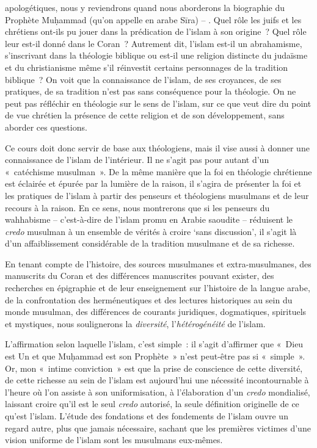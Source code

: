 apologétiques, nous y reviendrons quand nous aborderons la biographie du
Prophète Muḥammad (qu'on appelle en arabe Sīra) -- . Quel rôle les juifs
et les chrétiens ont-ils pu jouer dans la prédication de l'islam à son
origine~? Quel rôle leur est-il donné dans le Coran~? Autrement dit,
l'islam est-il un abrahamisme, s'inscrivant dans la théologie biblique
ou est-il une religion distincte du judaïsme et du christianisme même
s'il réinvestit certains personnages de la tradition biblique~? On voit
que la connaissance de l'islam, de ses croyances, de ses pratiques, de
sa tradition n'est pas sans conséquence pour la théologie. On ne peut
pas réfléchir en théologie sur le sens de l'islam, sur ce que veut dire
du point de vue chrétien la présence de cette religion et de son
développement, sans aborder ces questions.

Ce cours doit donc servir de base aux théologiens, mais il vise aussi à
donner une connaissance de l'islam de l'intérieur. Il ne s'agit pas pour
autant d'un «~catéchisme musulman~». De la même manière que la foi en
théologie chrétienne est éclairée et épurée par la lumière de la raison,
il s'agira de présenter la foi et les pratiques de l'islam à partir des
penseurs et théologiens musulmans et de leur recours à la raison. En ce
sens, nous montrerons que si les penseurs du wahhabisme -- c'est-à-dire
de l'islam promu en Arabie saoudite -- réduisent le \emph{credo}
musulman à un ensemble de vérités à croire `sans discussion', il s'agit
là d'un affaiblissement considérable de la tradition musulmane et de sa
richesse.

En tenant compte de l'histoire, des sources musulmanes et
extra-musulmanes, des manuscrits du Coran et des différences manuscrites
pouvant exister, des recherches en épigraphie et de leur enseignement
sur l'histoire de la langue arabe, de la confrontation des
herméneutiques et des lectures historiques au sein du monde musulman,
des différences de courants juridiques, dogmatiques, spirituels et
mystiques, nous soulignerons la \emph{diversité}, l'\emph{hétérogénéité}
de l'islam.

L'affirmation selon laquelle l'islam, c'est simple~: il s'agit
d'affirmer que «~Dieu est Un et que Muḥammad est son Prophète~» n'est
peut-être pas si «~simple~». Or, mon «~intime conviction~» est que la
prise de conscience de cette diversité, de cette richesse au sein de
l'islam est aujourd'hui une nécessité incontournable à l'heure où l'on
assiste à son uniformisation, à l'élaboration d'un \emph{credo}
mondialisé, laissant croire qu'il est le seul \emph{credo} autorisé, la
seule définition originelle de ce qu'est l'islam. L'étude des fondations
et des fondements de l'islam ouvre un regard autre, plus que jamais
nécessaire, sachant que les premières victimes d'une vision uniforme de
l'islam sont les musulmans eux-mêmes.


